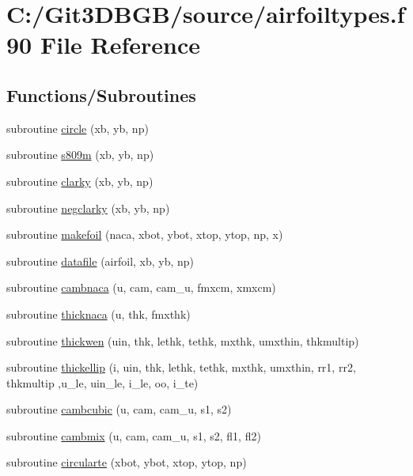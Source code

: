 \hypertarget{airfoiltypes_8f90}{}\section{C\+:/\+Git3\+D\+B\+G\+B/source/airfoiltypes.f90 File Reference}
\label{airfoiltypes_8f90}
\subsection*{Functions/\+Subroutines}
\begin{DoxyCompactItemize}
\item 
subroutine \hyperlink{airfoiltypes_8f90_a3856a45005e1ff6a6b5a66a8382dc8f3}{circle} (xb, yb, np)
\item 
subroutine \hyperlink{airfoiltypes_8f90_aa84a13e1320fe2e1eab9152e7fdb2df0}{s809m} (xb, yb, np)
\item 
subroutine \hyperlink{airfoiltypes_8f90_a6da6c16acb91da357dea201f88842610}{clarky} (xb, yb, np)
\item 
subroutine \hyperlink{airfoiltypes_8f90_a1bf682c66dd72805f48173e67201c849}{negclarky} (xb, yb, np)
\item 
subroutine \hyperlink{airfoiltypes_8f90_af5740105ff56b1b2168794605458ea38}{makefoil} (naca, xbot, ybot, xtop, ytop, np, x)
\item 
subroutine \hyperlink{airfoiltypes_8f90_a1a19cebda479d8a90783ab73bffa84f7}{datafile} (airfoil, xb, yb, np)
\item 
subroutine \hyperlink{airfoiltypes_8f90_abd280567076a4a22f4db89ad797773f5}{cambnaca} (u, cam, cam\+\_\+u, fmxcm, xmxcm)
\item 
subroutine \hyperlink{airfoiltypes_8f90_aeeba1d6343f34d391c0db6c40bf875bb}{thicknaca} (u, thk, fmxthk)
\item 
subroutine \hyperlink{airfoiltypes_8f90_adaace0fa9535fd4e8eb4a1e07819bdd2}{thickwen} (uin, thk, lethk, tethk, mxthk, umxthin, thkmultip)
\item 
subroutine \hyperlink{airfoiltypes_8f90_a4716e42043a5cad663238ac57e9662ef}{thickellip} (i, uin, thk, lethk, tethk, mxthk, umxthin, rr1, rr2, thkmultip                   ,u\+\_\+le, uin\+\_\+le, i\+\_\+le, oo, i\+\_\+te)
\item 
subroutine \hyperlink{airfoiltypes_8f90_a5f8930427d1cd12ba7d4120ec6a059e8}{cambcubic} (u, cam, cam\+\_\+u, s1, s2)
\item 
subroutine \hyperlink{airfoiltypes_8f90_ac00357f2293141bd7a6d9fbf23e9f03c}{cambmix} (u, cam, cam\+\_\+u, s1, s2, fl1, fl2)
\item 
subroutine \hyperlink{airfoiltypes_8f90_aa5fc53346a6f777f8f0e663027ec215f}{circularte} (xbot, ybot, xtop, ytop, np)
\end{DoxyCompactItemize}


